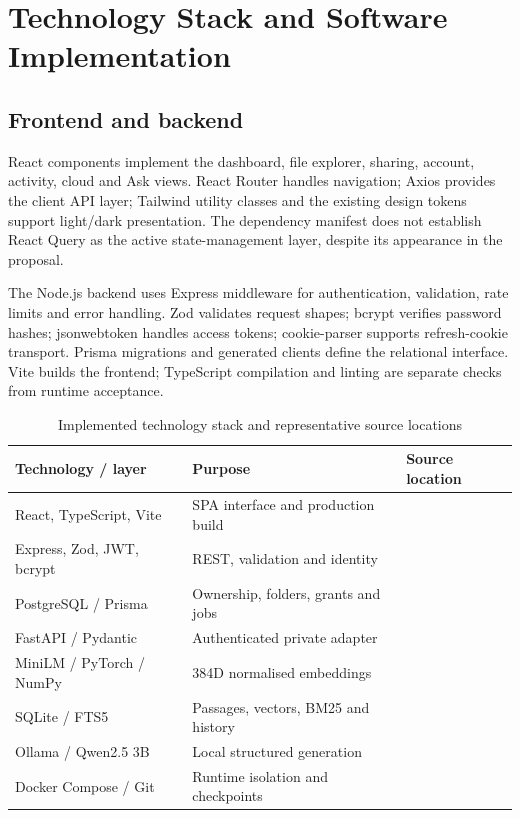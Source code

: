 \chapter{Technology Stack and Software Implementation}
\section{Frontend and backend}
React components implement the dashboard, file explorer, sharing, account, activity, cloud and Ask views. React Router handles navigation; Axios provides the client API layer; Tailwind utility classes and the existing design tokens support light/dark presentation. The dependency manifest does not establish React Query as the active state-management layer, despite its appearance in the proposal.

The Node.js backend uses Express middleware for authentication, validation, rate limits and error handling. Zod validates request shapes; bcrypt verifies password hashes; jsonwebtoken handles access tokens; cookie-parser supports refresh-cookie transport. Prisma migrations and generated clients define the relational interface. Vite builds the frontend; TypeScript compilation and linting are separate checks from runtime acceptance.
\par\begin{table}[htbp]\caption{Implemented technology stack and representative source locations}\small\begin{tabularx}{\linewidth}{p{.25\linewidth}Yp{.32\linewidth}}\toprule Technology / layer&Purpose&Source location\\\midrule
React, TypeScript, Vite&SPA interface and production build&\\
Express, Zod, JWT, bcrypt&REST, validation and identity&\\
PostgreSQL / Prisma&Ownership, folders, grants and jobs&\\
FastAPI / Pydantic&Authenticated private adapter&\\
MiniLM / PyTorch / NumPy&384D normalised embeddings&\\
SQLite / FTS5&Passages, vectors, BM25 and history&\\
Ollama / Qwen2.5 3B&Local structured generation&\\
Docker Compose / Git&Runtime isolation and checkpoints&\\\bottomrule\end{tabularx}\end{table}\par
